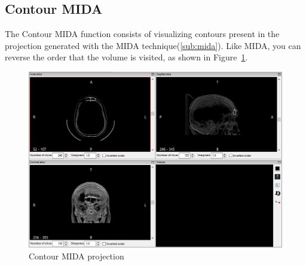 \subsection{Contour MIDA}

The Contour MIDA function consists of visualizing contours present in the projection generated with the MIDA technique(\ref{sub:mida}). Like MIDA, you can reverse the order that the volume is visited, as shown in Figure~\ref{fig:proj_contorno_mida}.

\begin{figure}[!h]
\centering
\includegraphics[scale=0.40]{../user_guide_figures/invesalius_screen/multiplanar_window_contour_mida_en.png}
\caption{Contour MIDA projection}
\label{fig:proj_contorno_mida}
\end{figure}
